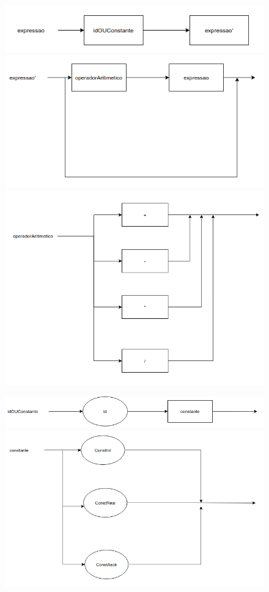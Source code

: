 \documentclass[11pt]{article}
\begin{document}
\begin{figure}[H]
    \includegraphics[scale=2.0]{grafos_sintaticos/expressao.png}

    \includegraphics[scale=2.0]{grafos_sintaticos/expressao'.png}

    \includegraphics[scale=2.0]{grafos_sintaticos/operador_aritimetico.png}
\end{figure}

\newpage

\begin{figure}[H]
    \includegraphics[scale=2.0]{grafos_sintaticos/id_ou_constante.png}

    \includegraphics[scale=2.0]{grafos_sintaticos/constante.png}
\end{figure}
\end{document}
